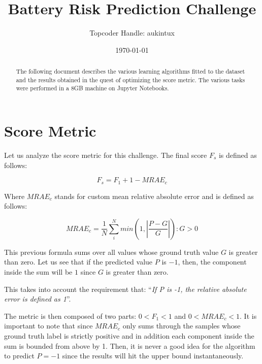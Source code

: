 \documentclass[a4paper]{article}
\title{Battery Risk Prediction Challenge}
\author{Topcoder Handle: aukintux}
\date{\today}
\begin{document}
\maketitle

\begin{abstract}
The following document describes the various learning algorithms fitted to the dataset and the results obtained in the quest of optimizing the score metric. The various tasks were performed in a 8GB machine on Jupyter Notebooks.
\end{abstract}

\section{Score Metric}
\label{sec:score_metric}

Let us analyze the score metric for this challenge. The final score $F_s$ is defined as follows:

\begin{equation}
F_s = F_1 + 1 - \mathit{MRAE_c}
\label{eq:final_score}
\end{equation}

Where $\mathit{MRAE_c}$ stands for custom mean relative absolute error and is defined as follows:

\begin{equation}
\mathit{MRAE_c} = \frac{1}{N} \sum_{i}^{N} min\left(1, \left|\frac{P-G}{G}\right|\right) : G > 0
\label{eq:custom_mrae}
\end{equation}

This previous formula sums over all values whose ground truth value $G$ is greater than zero. Let us see that if the predicted value $P$ is $-1$, then, the component inside the sum will be $1$ since $G$ is greater than zero. 

This takes into account the requirement that: ``\textit{If P is -1, the relative absolute error is defined as 1}''.

\vspace{5mm}

The metric is then composed of two parts: $0 < F_1 < 1$ and $0 < \mathit{MRAE_c} < 1$. It is important to note that since $\mathit{MRAE_c}$ only sums through the samples whose ground truth label is strictly positive and in addition each component inside the sum is bounded from above by 1. Then, it is never a good idea for the algorithm to predict $P=-1$ since the results will hit the upper bound instantaneously.

\clearpage
\end{document}
